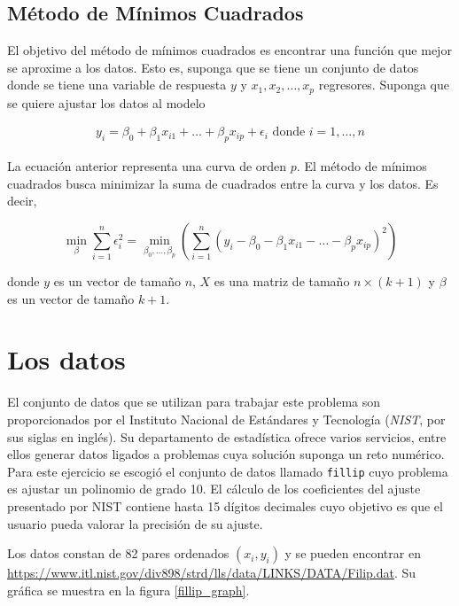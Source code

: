 \subsection{Método de Mínimos Cuadrados}

El objetivo del método de mínimos cuadrados es encontrar una función que mejor se aproxime a los datos. Esto es, suponga que se tiene un conjunto de datos donde se tiene una variable de respuesta $y$ y $x_1, x_2, \dots , x_p$ regresores. Suponga que se quiere ajustar los datos al modelo 

\begin{equation*}
	\begin{aligned}
		y_i = \beta_0 + \beta_1 x_{i1} + \dots + \beta_p x_{ip} + \epsilon_i \text{ donde } i = 1, \dots, n
	\end{aligned}
\end{equation*}

La ecuación anterior representa una curva de orden $p$. El método de mínimos cuadrados busca minimizar la suma de cuadrados entre la curva y los datos. Es decir,

\begin{equation*}
	\min_{\beta} \sum_{i = 1}^{n} \epsilon_i^{2}	= \min_{\beta_0, \dots, \beta_p} \left(\sum_{i = 1}^{n} (y_i - \beta_0 - \beta_1 x_{i1} - \dots - \beta_p x_{ip})^{2} \right)
 \end{equation*}


\noindent donde $y$ es un vector de tamaño $n$, $X$ es una matriz de tamaño $n \times (k + 1)$ y $\beta$ es un vector de tamaño $k + 1$. 


\section{Los datos}
El conjunto de datos que se utilizan para trabajar este problema son proporcionados por el Instituto Nacional de Estándares y Tecnología (\textit{NIST}, por sus siglas en inglés). Su departamento de estadística ofrece varios servicios, entre ellos generar datos ligados a problemas cuya solución suponga un reto numérico. Para este ejercicio se escogió el conjunto de datos llamado \texttt{fillip} cuyo problema es ajustar un polinomio de grado 10. 
El cálculo de los coeficientes del ajuste presentado por NIST contiene hasta 15 dígitos decimales cuyo objetivo es que el usuario pueda valorar la precisión de su ajuste. 

Los datos constan de 82 pares ordenados $(x_i, y_i)$ y se pueden encontrar en \url{https://www.itl.nist.gov/div898/strd/lls/data/LINKS/DATA/Filip.dat}. Su gráfica se muestra en la figura \ref{fillip_graph}. 

